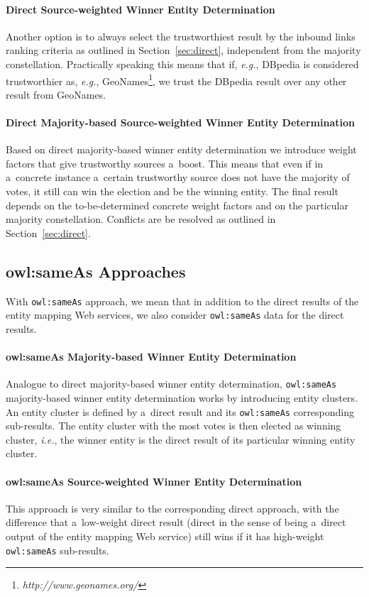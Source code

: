 \paragraph{Direct Source-weighted Winner Entity Determination}
Another option is to always select the trustworthiest result by the inbound links ranking criteria as outlined in Section~\ref{sec:direct}, independent from the majority constellation. Practically speaking this means that
if, \emph{e.g.}, DBpedia is considered trustworthier as, \emph{e.g.},  GeoNames\footnote{\textit{http://www.geonames.org/}}, we
trust the DBpedia result over any other result from GeoNames.

\paragraph{Direct Majority-based Source-weighted Winner Entity Determination}
Based on direct majority-based winner entity determination we introduce weight factors that give trustworthy
sources a~boost. This means that even if in a~concrete instance a~certain trustworthy source does not have the majority of votes, it still
can win the election and be the winning entity. The final result depends on the to-be-determined concrete
weight factors and on the particular majority constellation. Conflicts are be resolved as outlined in Section~\ref{sec:direct}.

\subsection{owl:sameAs Approaches}
With \texttt{owl:sameAs} approach, we mean that in addition to the direct results of the entity mapping Web services, we also
consider \texttt{owl:sameAs} data for the direct results.

\paragraph{owl:sameAs Majority-based Winner Entity Determination}\label{sec:owlsameas}
Analogue to direct majority-based winner entity determination, \texttt{owl:sameAs} majority-based winner entity
determination works by introducing entity clusters. An entity cluster is defined by a~direct result and its
\texttt{owl:sameAs} corresponding sub-results. The entity cluster with the most votes is then elected as winning
cluster, \emph{i.e.}, the winner entity is the direct result of its particular winning entity cluster.

\paragraph{owl:sameAs Source-weighted Winner Entity Determination}
This approach is very similar to the corresponding direct approach, with the difference that a~low-weight direct result
(direct in the sense of being a~direct output of the entity mapping Web service) still wins if it has high-weight
\texttt{owl:sameAs} sub-results.

